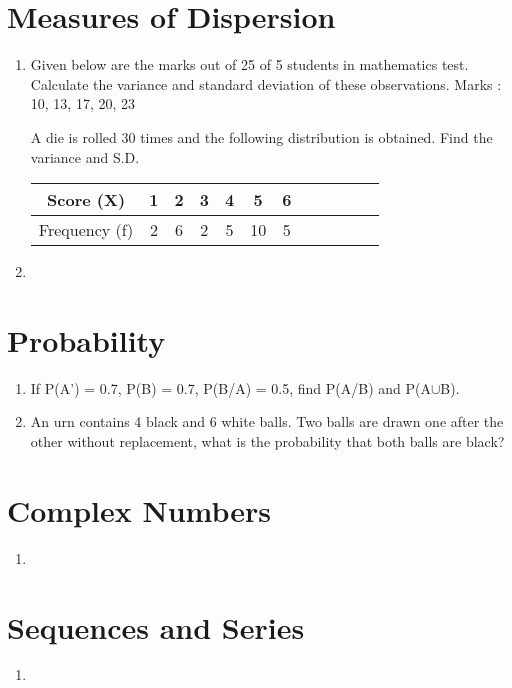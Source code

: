 \documentclass[17pt]{extarticle}
\begin{document}
\begin{multicols}{2}
\section{Measures of Dispersion}
\noindent
\begin{enumerate}
\item Given below are the marks out of 25
of 5 students in mathematics test. Calculate
the variance and standard deviation of these
observations. Marks : 10, 13, 17, 20, 23

A die is rolled 30 times and the following
distribution is obtained. Find the variance and
S.D.

\begin{tabular}{|c|*{11}{c|}}
\hline Score (X) & 1 & 2 & 3 & 4 & 5 & 6 \\
\hline Frequency (f) & 2 & 6 & 2 & 5 & 10 & 5 \\
\hline
\end{tabular}

\item

\end{enumerate} 

\section{Probability}
\noindent
\begin{enumerate}
\item If P(A') = 0.7, P(B) = 0.7, P(B/A) =
0.5, find P(A/B) and P(A$\cup$B).

\item An urn contains 4 black and 6 white
balls. Two balls are drawn one after the other
without replacement, what is the probability that
both balls are black?

\end{enumerate} 

\section{Complex Numbers}
\noindent
\begin{enumerate}
\item 

\end{enumerate} 

\section{Sequences and Series}
\noindent
\begin{enumerate}
\item


\end{enumerate}
\end{multicols}
\end{document}
